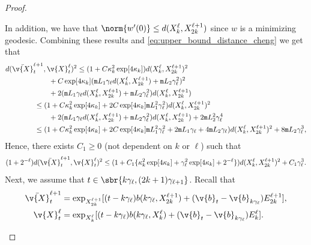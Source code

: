 \begin{proof}{}{}
\begin{enumerate}[wide, labelindent=0pt, label=(\alph*)]
		      In addition, we have that \(\norm{w'(0)} \leq d(X_k^\ell, X_{2k}^{\ell+1})\) since \(w\) is a minimizing geodesic.
		      Combining these results and \eqref{eq:upper_bound_distance_cheng} we get that \begin{align} &d(\bar{\v{X}}_{t}^{\ell+1}, \v{X}_{t}^\ell)^2 \leq (1 +C \kappa_k^2 \exp[4 \kappa_k]) d(X_k^\ell,X_{2k}^{\ell+1})^2 \\ & \qquad \qquad \qquad + C \exp[4 \kappa_k] (\mathtt{m}{L}_1 \gamma_\ell d(X_k^\ell, X_{2k}^{\ell+1}) + \mathtt{m}{L}_2 \gamma_\ell^2)^2 \\ & \qquad \qquad \qquad + 2 (\mathtt{m}{L}_1 \gamma_\ell d(X_k^\ell, X_{2k}^{\ell+1}) + \mathtt{m}{L}_2 \gamma_\ell^2)d(X_k^\ell, X_{2k}^{\ell+1}) \\ & \qquad \qquad \leq (1 +C \kappa_k^2 \exp[4 \kappa_k] + 2C \exp[4 \kappa_k] \mathtt{m}{L}_1^2 \gamma_\ell^2) d(X_k^\ell,X_{2k}^{\ell+1})^2 \\ & \qquad \qquad \qquad + 2 (\mathtt{m}{L}_1 \gamma_\ell d(X_k^\ell, X_{2k}^{\ell+1}) + \mathtt{m}{L}_2 \gamma_\ell^2)d(X_k^\ell, X_{2k}^{\ell+1}) + 2 \mathtt{m}{L}_2^2 \gamma_\ell^4 \\ & \qquad \qquad \leq (1 +C \kappa_k^2 \exp[4 \kappa_k] + 2C \exp[4 \kappa_k] \mathtt{m}{L}_1^2 \gamma_\ell^2 + 2 \mathtt{m}{L}_1 \gamma_\ell + 4 \mathtt{m}{L}_2 \gamma_\ell) d(X_k^\ell,X_{2k}^{\ell+1})^2 + 8 \mathtt{m}{L}_2 \gamma_\ell^3 , \end{align} Hence, there exists \(C_1 \geq 0\) (not dependent on \(k\) or \(\ell\)) such that \begin{equation} \label{eq:case_numeroooo_unoooo} (1 + 2^{-\ell}) d(\bar{\v{X}}_{t}^{\ell+1}, \v{X}_{t}^\ell)^2 \leq (1 +C_1\{ \kappa_k^2 \exp[4 \kappa_k] + \gamma_\ell^2 \exp[4\kappa_k] + 2^{-\ell}\}) d(X_k^\ell,X_{2k}^{\ell+1})^2 + C_1 \gamma_\ell^3 .
		      \end{equation}
		      Next, we assume that \(t \in \sbr{k \gamma_\ell, (2k+1) \gamma_{\ell+1}}\).
		      Recall that \begin{align} \bar{\v{X}}_{t}^{\ell+1} & = \exp_{X_{2k}^{\ell+1}}[(t - k\gamma_{\ell}) b( k \gamma_{\ell}, X_{2k}^{\ell+1}) + (\v{b}_{t} - \v{b}_{k \gamma_\ell}) E_{2k}^{\ell+1} ] , \\ \v{X}_{t}^\ell &= \exp_{X_k^\ell}[( t - k\gamma_\ell) b(k \gamma_\ell, X_k^\ell) + (\v{b}_{t} - \v{b}_{k \gamma_\ell}) E_{k}^{\ell} ] .
		      \end{align}

\end{enumerate}
\end{proof}
